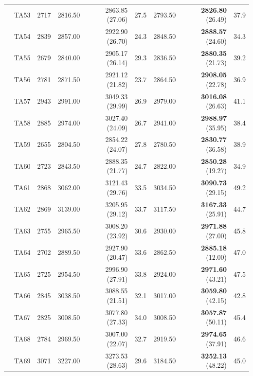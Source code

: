 \documentclass[icae]{iosart2x}
\begin{document}
\begin{appendix}
\begin{table}[htb]
\begin{tabular}{c|c|c|rrr|rrr}
 & TA53 & 2717 & 2816.50 & 2863.85 \tiny{(27.06)} & 27.5 & 2793.50 & \textbf{2826.80} \tiny{(26.49)} & 37.9\\
 & TA54 & 2839 & 2857.00 & 2922.90 \tiny{(26.70)} & 24.3 & 2848.50 & \textbf{2888.57} \tiny{(24.60)} & 34.3\\
 & TA55 & 2679 & 2840.00 & 2905.17 \tiny{(26.14)} & 29.3 & 2836.50 & \textbf{2880.35} \tiny{(21.73)} & 39.2\\
 & TA56 & 2781 & 2871.50 & 2921.12 \tiny{(21.82)} & 23.7 & 2864.50 & \textbf{2908.05} \tiny{(22.78)} & 36.9\\
 & TA57 & 2943 & 2991.00 & 3049.33 \tiny{(29.99)} & 26.9 & 2979.00 & \textbf{3016.08} \tiny{(26.63)} & 41.1\\
 & TA58 & 2885 & 2974.00 & 3027.40 \tiny{(24.09)} & 26.7 & 2941.00 & \textbf{2988.97} \tiny{(35.95)} & 38.4\\
 & TA59 & 2655 & 2804.50 & 2854.22 \tiny{(24.07)} & 27.8 & 2780.50 & \textbf{2830.77} \tiny{(36.58)} & 38.9\\
 & TA60 & 2723 & 2843.50 & 2888.35 \tiny{(21.77)} & 24.7 & 2822.00 & \textbf{2850.28} \tiny{(19.27)} & 34.9\\
\midrule
\parbox[t]{2mm}{}
 & TA61 & 2868 & 3062.00 & 3121.43 \tiny{(29.76)} & 33.5 & 3034.50 & \textbf{3090.73} \tiny{(29.15)} & 49.2\\
 & TA62 & 2869 & 3139.00 & 3205.95 \tiny{(29.12)} & 33.7 & 3117.50 & \textbf{3167.33} \tiny{(25.91)} & 44.7\\
 & TA63 & 2755 & 2965.50 & 3008.20 \tiny{(23.92)} & 30.6 & 2930.00 & \textbf{2971.88} \tiny{(27.00)} & 45.8\\
 & TA64 & 2702 & 2889.50 & 2927.90 \tiny{(20.47)} & 33.6 & 2862.50 & \textbf{2885.18} \tiny{(12.00)} & 47.0\\
 & TA65 & 2725 & 2954.50 & 2996.90 \tiny{(27.91)} & 33.8 & 2924.00 & \textbf{2971.60} \tiny{(43.21)} & 47.5\\
 & TA66 & 2845 & 3038.50 & 3088.55 \tiny{(21.51)} & 32.1 & 3017.00 & \textbf{3059.80} \tiny{(42.15)} & 42.8\\
 & TA67 & 2825 & 3008.50 & 3077.80 \tiny{(27.33)} & 34.0 & 3008.50 & \textbf{3057.87} \tiny{(50.11)} & 45.4\\
 & TA68 & 2784 & 2969.50 & 3007.00 \tiny{(22.07)} & 32.7 & 2919.50 & \textbf{2974.65} \tiny{(37.91)} & 46.6\\
 & TA69 & 3071 & 3227.00 & 3273.53 \tiny{(28.63)} & 29.6 & 3184.50 & \textbf{3252.13} \tiny{(48.22)} & 45.0\\

\end{tabular}
\end{table}
\end{appendix}
\end{document}
